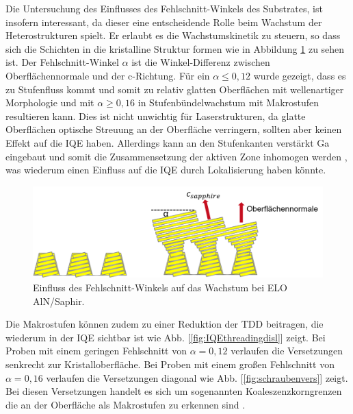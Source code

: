 Die Untersuchung des Einflusses des Fehlschnitt-Winkels des Substrates, ist insofern interessant, da dieser eine entscheidende Rolle beim Wachstum der Heterostrukturen spielt. Er erlaubt es die Wachstumskinetik zu steuern, so dass sich die Schichten in die kristalline Struktur  formen wie in Abbildung \ref{fig:offcut} zu sehen ist.
Der Fehlschnitt-Winkel $\alpha$ ist die Winkel-Differenz zwischen Oberflächennormale und der c-Richtung. Für ein $\alpha \leq 0,12 $ wurde gezeigt, dass es zu Stufenfluss kommt und somit zu relativ glatten Oberflächen mit wellenartiger Morphologie und mit $\alpha \geq 0,16 $ in Stufenbündelwachstum mit Makrostufen resultieren kann. Dies ist nicht unwichtig für Laserstrukturen, da glatte Oberflächen optische Streuung an der Oberfläche verringern, sollten aber keinen Effekt auf die IQE haben. Allerdings kann an den Stufenkanten verstärkt Ga eingebaut und somit die Zusammensetzung der aktiven Zone inhomogen werden \cite{zeimeru} \cite{MOGILATENKO2014222} \cite{fmehnke}, was wiederum einen Einfluss auf die IQE durch Lokalisierung haben könnte.
%
\begin{figure}[htb]
\includegraphics[width=\linewidth]{Bilder/offcut.png}
\caption{Einfluss des Fehlschnitt-Winkels auf das Wachstum bei ELO AlN/Saphir.}
\label{fig:offcut}
\end{figure}
\noindent 
\vspace{1cm}
%
Die Makrostufen können zudem zu einer Reduktion der TDD beitragen, die wiederum in der IQE sichtbar ist wie Abb. [\ref{fig:IQEthreadingdisl}] zeigt. Bei Proben mit einem geringen Fehlschnitt von $\alpha = 0,12 $ verlaufen die Versetzungen senkrecht zur Kristalloberfläche. Bei Proben mit einem großen Fehlschnitt von $\alpha = 0,16 $ verlaufen die Versetzungen diagonal wie Abb. [\ref{fig:schraubenvers}] zeigt. Bei diesen Versetzungen handelt es sich um sogenannten Koaleszenzkorngrenzen die an der Oberfläche als Makrostufen zu erkennen sind \cite{MOGILATENKO2014222}. 
%
